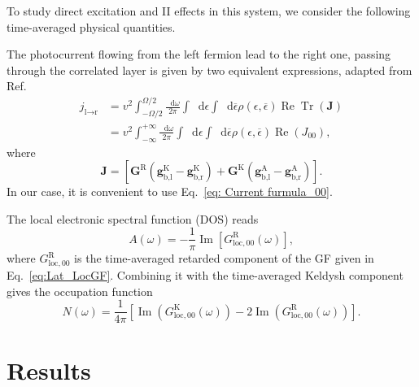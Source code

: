 \documentclass[aps,prb,groupedaddress,showpacs,twocolumn,superscriptaddress,10pt]{revtex4-2}
\newcommand*\dd{\mathop{}\!\mathrm{d}}
\DeclareMathOperator*{\rre}{Re}
\DeclareMathOperator*{\iim}{Im}
\DeclareMathOperator*{\Tr}{Tr}
\begin{document}
To study direct excitation and II effects in this system,
we consider the following time-averaged physical quantities.

The photocurrent flowing from the left fermion lead to the right one, passing through the correlated layer is given by two equivalent expressions, adapted from Ref.~\cite{so.do.18}
% 
\begin{align}
j_{\text{l}\rightarrow\text{r}}&=v^2\int_{-\Omega/2}^{\Omega/2}\frac{\dd\omega}{2\pi} \int \dd\epsilon \int \dd\overline{\epsilon} \rho(\epsilon,\overline{\epsilon}) \rre\Tr(\boldsymbol{J})\label{eq: Current furmula_Omega}\\
&= v^2\int_{-\infty}^{+\infty}\frac{\dd\omega}{2\pi} \int \dd\epsilon \int \dd\overline{\epsilon} \rho(\epsilon,\overline{\epsilon}) \rre(J_{00}),\label{eq: Current furmula_00}
\end{align}
% 
where
% 
\begin{equation}
  \boldsymbol{J}=\left[\boldsymbol{G}^{\text{R}}(\boldsymbol{g}_{\text{b},\text{l}}^{\text{K}}-\boldsymbol{g}_{\text{b},\text{r}}^{\text{K}})+\boldsymbol{G}^{\text{K}}(\boldsymbol{g}_{\text{b},\text{l}}^{\text{A}}-\boldsymbol{g}_{\text{b},\text{r}}^{\text{A}})\right].
\end{equation}
% 
In our case, it is convenient to use 
Eq.~\eqref{eq: Current furmula_00}. 


The local electronic spectral function (DOS) reads
%  
\begin{equation}
\label{eq:el_spectral_function}
 A(\omega)=-\frac{1}{\pi}\iim[G_{\text{loc},00}^{\text{R}}(\omega)],
\end{equation}
% 
where $G^{\text{R}}_{\text{loc},00}$ is the time-averaged retarded component of the GF given in Eq.~\eqref{eq:Lat_LocGF}.
Combining it with the time-averaged Keldysh component gives the occupation function
\begin{equation}
N(\omega) = \frac{1}{4\pi} [\iim(G^{\text{K}}_{\text{loc},00}(\omega))-2\iim(G^{\text{R}}_{\text{loc},00}(\omega))].
\end{equation}

\section{Results}
\label{sec:results}       
 
\end{document}
